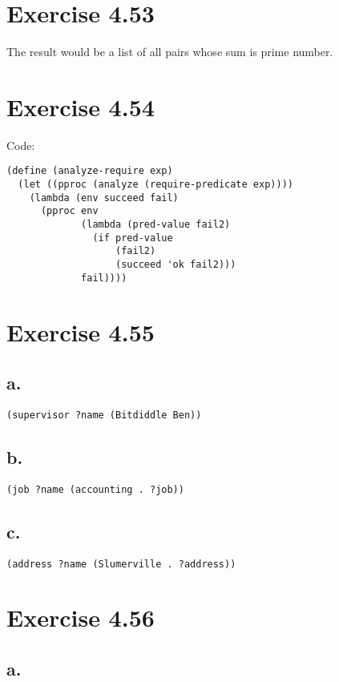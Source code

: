 \documentclass[../main.tex]{subfiles}
\begin{document}
\section{Exercise 4.53}

The result would be a list of all pairs whose sum is prime number.

\section{Exercise 4.54}

Code:

\begin{lstlisting}
(define (analyze-require exp)
  (let ((pproc (analyze (require-predicate exp))))
    (lambda (env succeed fail)
      (pproc env
             (lambda (pred-value fail2)
               (if pred-value
                   (fail2)
                   (succeed 'ok fail2)))
             fail))))
\end{lstlisting}

\section{Exercise 4.55}

\subsection{a.}

\lstinline{(supervisor ?name (Bitdiddle Ben))}

\subsection{b.}

\lstinline{(job ?name (accounting . ?job))}

\subsection{c.}

\lstinline{(address ?name (Slumerville . ?address))}

\section{Exercise 4.56}

\subsection{a.}
\end{document}
